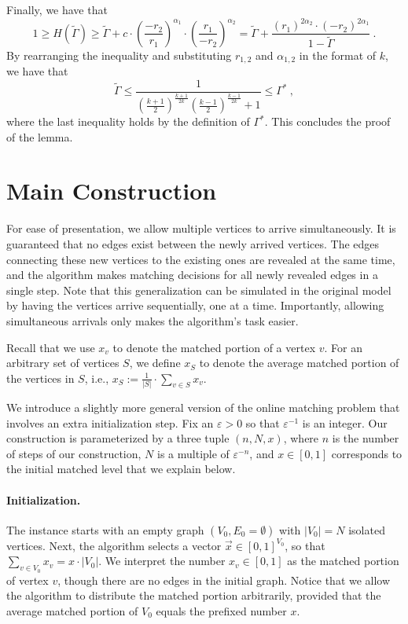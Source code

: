 \documentclass[11pt,letterpaper]{article}
\newcommand{\vect}[1]{\ensuremath{\vec{#1}}}
\newcommand{\eps}{\varepsilon}
\begin{document}
Finally, we have that
\[
1 \ge H(\tilde{\Gamma})\ge \tilde{\Gamma} + c \cdot \left( \frac{-r_2}{r_1}\right)^{\alpha_1}\cdot \left(\frac{r_1}{-r_2}\right)^{\alpha_2} = \tilde{\Gamma}+\frac{(r_1)^{2\alpha_2}\cdot (-r_2)^{2\alpha_1}}{1-\tilde{\Gamma}}~.
\]
By rearranging the inequality and substituting $r_{1,2}$ and $\alpha_{1,2}$ in the format of $k$, we have that
\[
\tilde{\Gamma} \le \frac{1}{\left( \frac{k+1}{2}\right)^{\frac{k+1}{2k}} \left( \frac{k-1}{2}\right)^{\frac{k-1}{2k}}+1} \le \Gamma^*~,
\]
where the last inequality holds by the definition of $\Gamma^*$. This concludes the proof of the lemma.
 
\section{Main Construction}
\label{sec:construction}
For ease of presentation, we allow multiple vertices to arrive simultaneously. It is guaranteed that no edges exist between the newly arrived vertices. The edges connecting these new vertices to the existing ones are revealed at the same time, and the algorithm makes matching decisions for all newly revealed edges in a single step. Note that this generalization can be simulated in the original model by having the vertices arrive sequentially, one at a time.
Importantly, allowing simultaneous arrivals only makes the algorithm's task easier.

Recall that we use $x_v$ to denote the matched portion of a vertex $v$. For an arbitrary set of vertices $S$, we define $x_S$ to denote the average matched portion of the vertices in $S$, i.e., $x_S := \frac{1}{|S|} \cdot \sum_{v \in S} x_v$.

We introduce a slightly more general version of the online matching problem that involves an extra initialization step. Fix an $\eps >0$ so that $\eps^{-1}$ is an integer. Our construction is parameterized by a three tuple $(n,N,x)$, where $n$ is the number of steps of our construction, $N$ is a multiple of $\eps^{-n}$, and $x \in [0,1]$ corresponds to the initial matched level that we explain below.

\paragraph{Initialization.} 
The instance starts with an empty graph $(V_0,E_0=\emptyset)$ with $|V_0|=N$ isolated vertices. 
Next, the algorithm selects a vector $\vect{x} \in [0,1]^{V_0}$, so that $\sum_{v \in V_0} x_v = x \cdot |V_0|$. We interpret the number $x_v \in [0,1]$ as the matched portion of vertex $v$, though there are no edges in the initial graph. Notice that we allow the algorithm to distribute the matched portion arbitrarily, provided that the average matched portion of $V_0$ equals the prefixed number $x$.
\end{document}
